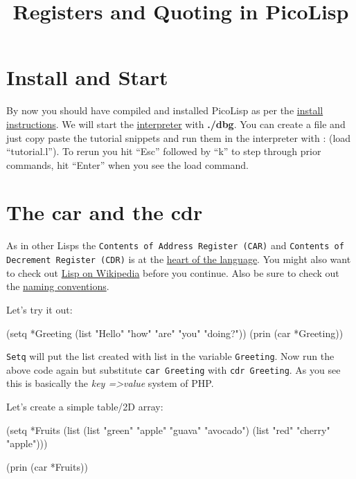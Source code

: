 \title{Registers and Quoting in PicoLisp}

\maketitle

\section{Install and Start}
\label{sec:reg-and-quot-install-and-start}

By now you should have compiled and installed PicoLisp as per the
\href{http://www.software-lab.de/INSTALL}{install instructions}. We will
start the \href{http://www.software-lab.de/tut.html#ledit}{interpreter}
with \textbf{./dbg}. You can create a file and just copy paste the tutorial
snippets and run them in the interpreter with : (load ``tutorial.l''). To
rerun you hit ``Esc'' followed by ``k'' to step through prior commands, hit
``Enter'' when you see the load command.

\section{The car and the cdr}
\label{sec:reg-and-quot-the-car-and-the-cdr}

As in other Lisps the \texttt{Contents of Address Register (CAR)} and
\texttt{Contents of Decrement Register (CDR)} is at the
\href{http://www.software-lab.de/ref.html#cell}{heart of the
  language}. You might also want to check out
\href{http://en.wikipedia.org/wiki/Lisp_%28programming_language%29}{Lisp on Wikipedia} before you continue. Also be sure to check out the
  \href{http://www.software-lab.de/ref.html#conv}{naming conventions}.

Let's try it out:

\begin{wideverbatim}
(setq *Greeting (list "Hello" "how" "are" "you" "doing?"))
(prin (car *Greeting))
\end{wideverbatim}

\texttt{Setq} will put the list created with list in the variable \texttt{Greeting}. Now
run the above code again but substitute \texttt{car Greeting} with \texttt{cdr Greeting}.
As you see this is basically the \emph{key =\textgreater  value} system of PHP.

Let's create a simple table/2D array:

\begin{wideverbatim}
(setq *Fruits 
      (list 
       (list "green" "apple" "guava" "avocado") 
       (list "red" "cherry" "apple")))

(prin (car *Fruits))
\end{wideverbatim}

